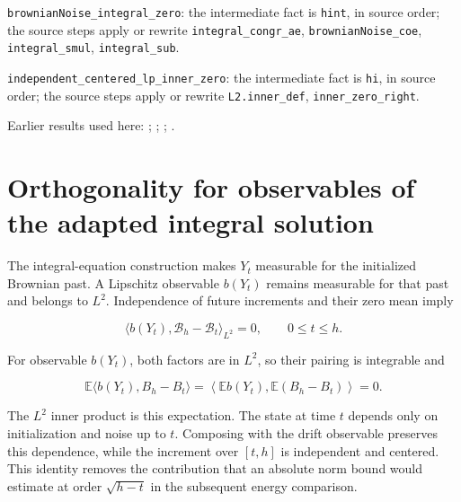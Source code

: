 \documentclass[11pt,a4paper]{article}
\begin{document}
\begin{leanbox}
\texttt{brownian\allowbreak{}Noise\_\allowbreak{}integral\_\allowbreak{}zero}: the intermediate fact is \texttt{hint}, in source order; the source steps apply or rewrite \texttt{integral\_\allowbreak{}congr\_\allowbreak{}ae}, \texttt{brownian\allowbreak{}Noise\_\allowbreak{}coe}, \texttt{integral\_\allowbreak{}smul}, \texttt{integral\_\allowbreak{}sub}.



\texttt{independent\_\allowbreak{}centered\_\allowbreak{}lp\_\allowbreak{}inner\_\allowbreak{}zero}: the intermediate fact is \texttt{hi}, in source order; the source steps apply or rewrite \texttt{L2.\allowbreak{}inner\_\allowbreak{}def}, \texttt{inner\_\allowbreak{}zero\_\allowbreak{}right}.
\end{leanbox}


Earlier results used here: \cite[Section~3.24.1]{LangevinLean2026ULASC}; \cite[Section~3.24.8]{LangevinLean2026ULASC}; \cite[Section~3.24.9]{LangevinLean2026ULASC}; \cite[Section~3.25.1]{LangevinLean2026ULASC}.

\section{\texorpdfstring{Orthogonality for observables of the adapted integral solution}{Orthogonality for observables of the adapted integral solution}}


The integral-equation construction makes \(Y_t\) measurable for the initialized Brownian past. A Lipschitz observable \(b(Y_t)\) remains measurable for that past and belongs to \(L^2\). Independence of future increments and their zero mean imply

\[\langle b(Y_t),\mathcal B_h-\mathcal B_t\rangle_{L^2}=0,\qquad0\le t\le h.\]

For observable \(b(Y_t)\), both factors are in \(L^2\), so their pairing is integrable and

\[\mathbb E\langle b(Y_t),B_h-B_t\rangle=\left\langle\mathbb E b(Y_t),\mathbb E(B_h-B_t)\right\rangle=0.\]

The \(L^2\) inner product is this expectation. The state at time \(t\) depends only on initialization and noise up to \(t\). Composing with the drift observable preserves this dependence, while the increment over \([t,h]\) is independent and centered. This identity removes the contribution that an absolute norm bound would estimate at order \(\sqrt{h-t}\) in the subsequent energy comparison.
\end{document}
